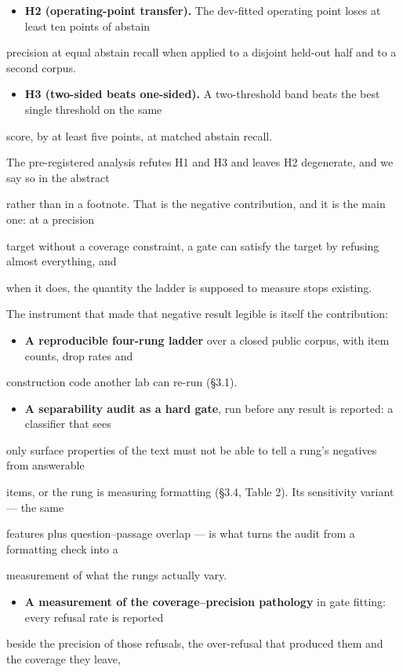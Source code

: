 \begin{itemize}
  \item \textbf{H2 (operating-point transfer).} The dev-fitted operating point loses at least ten points of abstain
\end{itemize}
precision at equal abstain recall when applied to a disjoint held-out half and to a second corpus.

\begin{itemize}
  \item \textbf{H3 (two-sided beats one-sided).} A two-threshold band beats the best single threshold on the same
\end{itemize}
score, by at least five points, at matched abstain recall.

The pre-registered analysis refutes H1 and H3 and leaves H2 degenerate, and we say so in the abstract

rather than in a footnote. That is the negative contribution, and it is the main one: at a precision

target without a coverage constraint, a gate can satisfy the target by refusing almost everything, and

when it does, the quantity the ladder is supposed to measure stops existing.

The instrument that made that negative result legible is itself the contribution:

\begin{itemize}
  \item \textbf{A reproducible four-rung ladder} over a closed public corpus, with item counts, drop rates and
\end{itemize}
construction code another lab can re-run (§3.1).

\begin{itemize}
  \item \textbf{A separability audit as a hard gate}, run before any result is reported: a classifier that sees
\end{itemize}
only surface properties of the text must not be able to tell a rung's negatives from answerable

items, or the rung is measuring formatting (§3.4, Table 2). Its sensitivity variant --- the same

features plus question--passage overlap --- is what turns the audit from a formatting check into a

measurement of what the rungs actually vary.

\begin{itemize}
  \item \textbf{A measurement of the coverage--precision pathology} in gate fitting: every refusal rate is reported
\end{itemize}
beside the precision of those refusals, the over-refusal that produced them and the coverage they leave,

